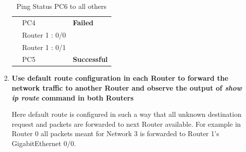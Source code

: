 \documentclass[a4paper,11pt]{article}
\begin{document}
\begin{enumerate}
\begin{table}[H]
\begin{tabular}{| m{10em}| m{10em}| m{10em} |}
                  {\cellcolor[rgb]{0.141,0.525,1}}                                & PC4                  & \multirow{-7}{*}{{\cellcolor[rgb]{1,0.169,0.082}}\textbf{Failed}}         \\
                  \hhline{|>{\arrayrulecolor[rgb]{0.141,0.525,1}}->{\arrayrulecolor{black}}--|}
                  {\cellcolor[rgb]{0.141,0.525,1}}                                & Router 1 : 0/0       & {\cellcolor[rgb]{0.396,0.984,0.804}}                                      \\
                  \hhline{|>{\arrayrulecolor[rgb]{0.141,0.525,1}}->{\arrayrulecolor{black}}->{\arrayrulecolor[rgb]{0.396,0.984,0.804}}->{\arrayrulecolor{black}}|}
                  {\cellcolor[rgb]{0.141,0.525,1}}                                & Router 1 : 0/1       & {\cellcolor[rgb]{0.396,0.984,0.804}}                                      \\
                  \hhline{|>{\arrayrulecolor[rgb]{0.141,0.525,1}}->{\arrayrulecolor{black}}->{\arrayrulecolor[rgb]{0.396,0.984,0.804}}->{\arrayrulecolor{black}}|}
                  \multirow{-10}{*}{{\cellcolor[rgb]{0.141,0.525,1}}\textbf{PC6}} & PC5                  & \multirow{-3}{*}{{\cellcolor[rgb]{0.396,0.984,0.804}}\textbf{Successful}} \\
                  \hline
              \end{tabular}
              \caption{ Ping Status PC6 to all others}
          \end{table}




    \item\textbf{ Use default route configuration in each Router to forward the network traffic to another  Router and observe the output of \textit{show ip route} command in both Routers}


          Here default route is configured in such a way that all unknown destination request and packets are forwarded to next Router available. For example in Router 0 all packets meant for Network 3 is forwarded to Router 1's GigabitEthernet 0/0.


\end{enumerate}
\end{document}

